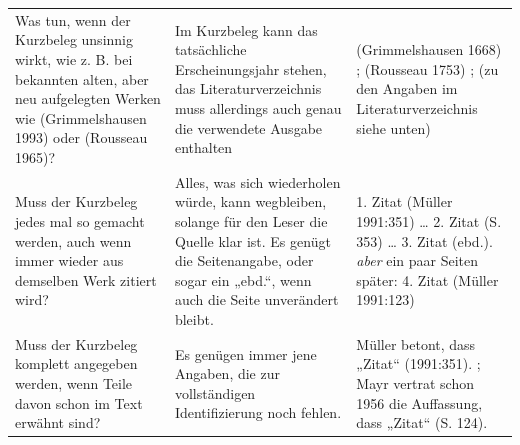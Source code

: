 \documentclass[]{book}
\theoremstyle{definition}
\theoremstyle{definition}
\theoremstyle{definition}
\theoremstyle{remark}
\begin{document}
\begin{longtable}[]{@{}lll@{}}
\begin{minipage}[t]{0.18\columnwidth}
Was tun, wenn der Kurzbeleg unsinnig wirkt, wie z. B. bei bekannten
alten, aber neu aufgelegten Werken wie (Grimmelshausen 1993) oder
(Rousseau 1965)?\strut
\end{minipage} & \begin{minipage}[t]{0.37\columnwidth}\raggedright\strut
Im Kurzbeleg kann das tatsächliche Erscheinungsjahr stehen, das
Literaturverzeichnis muss allerdings auch genau die verwendete Ausgabe
enthalten\strut
\end{minipage} & \begin{minipage}[t]{0.36\columnwidth}\raggedright\strut
(Grimmelshausen 1668) ; (Rousseau 1753) ; (zu den Angaben im
Literaturverzeichnis siehe unten) \vspace{-6mm}\strut
\end{minipage}\tabularnewline
\begin{minipage}[t]{0.18\columnwidth}\raggedright\strut
Muss der Kurzbeleg jedes mal so gemacht werden, auch wenn immer wieder
aus demselben Werk zitiert wird?\strut
\end{minipage} & \begin{minipage}[t]{0.37\columnwidth}\raggedright\strut
Alles, was sich wiederholen würde, kann wegbleiben, solange für den
Leser die Quelle klar ist. Es genügt die Seitenangabe, oder sogar ein
„ebd.``, wenn auch die Seite unverändert bleibt.\strut
\end{minipage} & \begin{minipage}[t]{0.36\columnwidth}\raggedright\strut
1. Zitat (Müller 1991:351) \ldots{} 2. Zitat (S. 353) \ldots{} 3. Zitat
(ebd.). \emph{aber} ein paar Seiten später: 4. Zitat (Müller 1991:123)
\vspace{-6mm}\strut
\end{minipage}\tabularnewline
\begin{minipage}[t]{0.18\columnwidth}\raggedright\strut
Muss der Kurzbeleg komplett angegeben werden, wenn Teile davon schon im
Text erwähnt sind?\strut
\end{minipage} & \begin{minipage}[t]{0.37\columnwidth}\raggedright\strut
Es genügen immer jene Angaben, die zur vollständigen Identifizierung
noch fehlen.\strut
\end{minipage} & \begin{minipage}[t]{0.36\columnwidth}\raggedright\strut
Müller betont, dass „Zitat`` (1991:351). ; Mayr vertrat schon 1956 die
Auffassung, dass „Zitat`` (S. 124). \vspace{-6mm}\strut
\end{minipage}\tabularnewline

\end{longtable}
\end{document}
